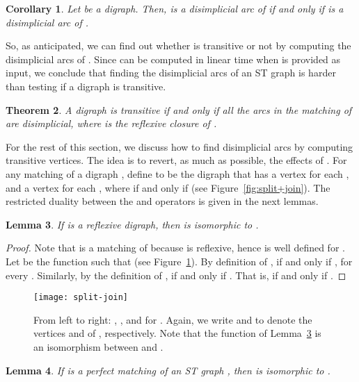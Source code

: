\documentclass[a4paper,11pt]{article}
\newtheorem{theorem}{Theorem}
\newtheorem{lemma}[theorem]{Lemma}
\newtheorem{corollary}[theorem]{Corollary}
\begin{document}
\begin{corollary}\label{cor:SPLIT disimplicials}
  Let  be a digraph.  Then,  is a disimplicial arc of  if and only if\/  is a disimplicial arc of\/ .
\end{corollary}

So, as anticipated, we can find out whether  is transitive or not by computing the disimplicial arcs of .  Since  can be computed in linear time when  is provided as input, we conclude that finding the disimplicial arcs of an ST graph is harder than testing if a digraph is transitive.

\begin{theorem}\label{thm:transitive is disimplicial}
  A digraph  is transitive if and only if all the arcs in the matching\/  of\/  are disimplicial, where  is the reflexive closure of .  
\end{theorem}

For the rest of this section, we discuss how to find disimplicial arcs by computing transitive vertices.  The idea is to revert, as much as possible, the effects of .  For any matching  of a digraph , define  to be the digraph  that has a vertex  for each , and a vertex  for each , where  if and only if  (see Figure~\ref{fig:split+join}).  The restricted duality between the  and  operators is given in the next lemmas.

\begin{lemma}\label{lem:bip then join}
  If  is a reflexive digraph, then  is isomorphic to\/ .
\end{lemma}

\begin{proof}
  Note that  is a matching of  because  is reflexive, hence  is well defined for .  Let  be the function such that  (see Figure~\ref{fig:bip then join}).   By definition of ,  if and only if , for every .  Similarly, by the definition of ,  if and only if .  That is,  if and only if .    
\end{proof}

\begin{figure}
 \centering
 \texttt{[image: split-join]}
 \caption{From left to right: , , and  for .   Again, we write  and  to denote the vertices  and  of , respectively. Note that the function  of Lemma~\ref{lem:bip then join} is an isomorphism between  and .}\label{fig:bip then join}
\end{figure}


\begin{lemma}\label{lem:join then bip}
  If  is a perfect matching of an ST graph , then  is isomorphic to\/ .
\end{lemma}
\end{document}
